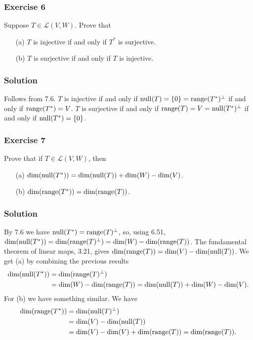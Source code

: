 \subsubsection*{Exercise 6}

Suppose $T \in \mathcal{L}(V, W)$.
Prove that
\begin{itemize}
\item[(a)] $T$ is injective if and only if $T^*$ is surjective.
\item[(b)] $T$ is surjective if and only if $T$ is injective.
\end{itemize}

\subsubsection*{Solution}

Follows from 7.6.
$T$ is injective if and only if $\mathrm{null}(T) = \{0\} = \mathrm{range}(T^*)^{\perp}$ if and only if $\mathrm{range}(T^*) = V$.
$T$ is surjective if and only if $\mathrm{range}(T) = V = \mathrm{null}(T^*)^{\perp}$ if and only if $\mathrm{null}(T^*) = \{0\}$.


\subsubsection*{Exercise 7}

Prove that if $T \in \mathcal{L}(V, W)$, then
\begin{itemize}
\item[(a)] $\dim(\mathrm{null}(T^*)) = \dim(\mathrm{null}(T)) + \dim(W) - \dim(V)$.
\item[(b)] $\dim(\mathrm{range}(T^*)) = \dim(\mathrm{range}(T))$.
\end{itemize}

\subsubsection*{Solution}

By 7.6 we have $\mathrm{null}(T^*) = \mathrm{range}(T)^{\perp}$, so, using 6.51, $\dim(\mathrm{null}(T^*)) = \dim(\mathrm{range}(T)^{\perp}) = \dim(W) - \dim(\mathrm{range}(T))$.
The fundamental theorem of linear maps, 3.21, gives $\dim(\mathrm{range}(T)) = \dim(V) - \dim(\mathrm{null}(T))$.
We get (a) by combining the previous results
\begin{equation*}
    \begin{split}
        \dim(\mathrm{null}(T^*)) &= \dim(\mathrm{range}(T)^{\perp}) \\
            &= \dim(W) - \dim(\mathrm{range}(T))
            = \dim(\mathrm{null}(T)) + \dim(W) - \dim(V).
    \end{split}
\end{equation*}
For (b) we have something similar.
We have
\begin{equation*}
    \begin{split}
        \dim(\mathrm{range}(T^*)) &= \dim(\mathrm{null}(T)^{\perp}) \\
            &= \dim(V) - \dim(\mathrm{null}(T)) \\
            &= \dim(V) - \dim(V) + \dim(\mathrm{range}(T))
            = \dim(\mathrm{range}(T)).
    \end{split}
\end{equation*}
